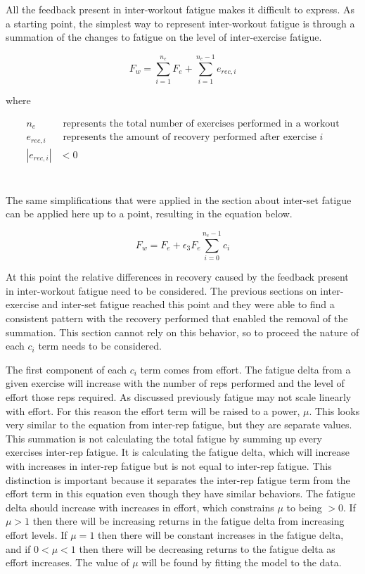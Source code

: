 All the feedback present in inter-workout fatigue makes it difficult to express. As a starting point, the simplest way to represent inter-workout fatigue is through a summation of the changes to fatigue on the level of inter-exercise fatigue.

\begin{minipage}{\textwidth}
	\begin{equation*}
		F_w=\sum_{i=1}^{n_e} F_e+\sum_{i=1}^{n_e-1} e_{rec,i}
	\end{equation*}
	\centerline{where}
	\begin{equation*}
		\begin{split}
			n_e & \text{ represents the total number of exercises performed in a workout} \\
			e_{rec,i} & \text{ represents the amount of recovery performed after exercise }i \\
			|e_{rec,i}| & < 0 \\
		\end{split}
	\end{equation*}
\end{minipage}\\

The same simplifications that were applied in the section about inter-set fatigue can be applied here up to a point, resulting in the equation below.

\begin{equation*}
	F_w =
	F_{e} + \epsilon_3 F_e \sum_{i=0}^{n_e-1} c_i
\end{equation*}

At this point the relative differences in recovery caused by the feedback present in inter-workout fatigue need to be considered. The previous sections on inter-exercise and inter-set fatigue reached this point and they were able to find a consistent pattern with the recovery performed that enabled the removal of the summation. This section cannot rely on this behavior, so to proceed the nature of each $c_i$ term needs to be considered. 

The first component of each $c_i$ term comes from effort. The fatigue delta from a given exercise will increase with the number of reps performed and the level of effort those reps required. As discussed previously fatigue may not scale linearly with effort. For this reason the effort term will be raised to a power, $\mu$. This looks very similar to the equation from inter-rep fatigue, but they are separate values. This summation is not calculating the total fatigue by summing up every exercises inter-rep fatigue. It is calculating the fatigue delta, which will increase with increases in inter-rep fatigue but is not equal to inter-rep fatigue. This distinction is important because it separates the inter-rep fatigue term from the effort term in this equation even though they have similar behaviors. The fatigue delta should increase with increases in effort, which constrains $\mu$ to being $>0$. If $\mu>1$ then there will be increasing returns in the fatigue delta from increasing effort levels. If $\mu=1$ then there will be constant increases in the fatigue delta, and if $0<\mu<1$ then there will be decreasing returns to the fatigue delta as effort increases. The value of $\mu$ will be found by fitting the model to the data.


